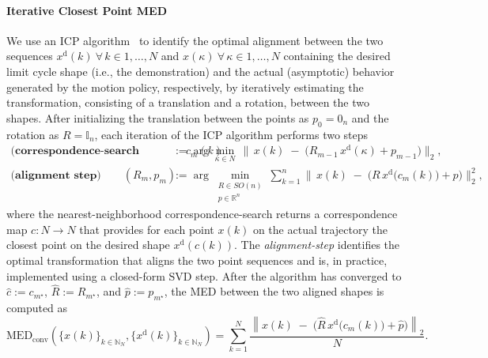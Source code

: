 \paragraph{Iterative Closest Point MED}
We use an \gls{ICP} algorithm~\citep{besl1992method} to identify the optimal alignment between the two sequences $x^\mathrm{d}(k) \: \forall \, k \in 1,\dots,N$ and $x(\kappa) \: \forall \, \kappa \in 1,\dots,N$ containing the desired limit cycle shape (i.e., the demonstration) and the actual (asymptotic) behavior generated by the motion policy, respectively, by iteratively estimating the transformation, consisting of a translation and a rotation, between the two shapes.
After initializing the translation between the points as $p_0 = 0_n$ and the rotation as $R = \mathbb{I}_n$, each iteration of the \gls{ICP} algorithm performs two steps
\begin{equation}
\begin{aligned}
\textbf{(correspondence-search step)}\qquad
      c_{m}(k) &:= 
      \arg\min_{\kappa \in N}\,
          \bigl\|\,x(k)\;-\;
          \bigl(R_{m-1}\,x^\mathrm{d}(\kappa)+p_{m-1}\bigr)\bigr\|_2 ,
      \\[6pt]
\textbf{(alignment step)}\qquad
      (R_{m},p_{m}) &:=
      \arg\min_{\substack{R\in SO(n)\\ p \in\mathbb{R}^{n}}}
          \sum_{k = 1}^n
          \bigl\|\,x(k)\;-\;
          \bigl(R\,x^\mathrm{d}\bigl(c_{m}(k)\bigr)+p\bigr)\bigr\|_2^{2},
\end{aligned}
\end{equation}
where the nearest-neighborhood correspondence-search returns a correspondence map $c: N \to N$ that provides for each point $x(k)$ on the actual trajectory the closest point on the desired shape $x^\mathrm{d}(c(k))$. The \emph{alignment-step} identifies the optimal transformation that aligns the two point sequences and is, in practice, implemented using a closed-form SVD step.
After the algorithm has converged to $\hat{c}:=c_{m^{\star}}$, $\hat{R}:=R_{m^{\star}}$, and $\hat{p}:=p_{m^{\star}}$, the \gls{MED} between the two aligned shapes is computed as
\begin{equation}
    \mathrm{MED}_\mathrm{conv}\left (\{x(k)\}_{k\in\mathbb{N}_N},\{x^{\mathrm d}(k)\}_{k\in\mathbb{N}_N} \right ) = \sum_{k=1}^{N} \frac{\left \lVert x(k)\;-\;
          \bigl(\hat{R}\,x^\mathrm{d}\bigl(c_{m}(k)\bigr)+\hat{p}\bigr) \right \rVert_2}{N}.
\end{equation}
